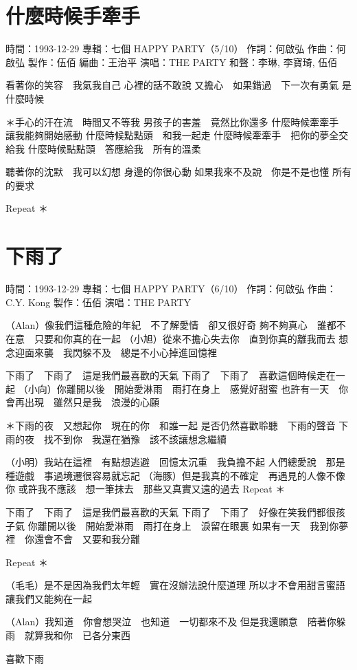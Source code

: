 \documentclass[UTF8,a4paper,oneside,twocolumn,12pt]{ctexbook}
\newcommand{\infopair}[2]{\textbullet #1：#2}
\newcommand{\zc}[1][伍佰]{\infopair{作詞}{#1}}
\newcommand{\zq}[1][伍佰]{\infopair{作曲}{#1}}
\newcommand{\bq}[1][伍佰]{\infopair{編曲}{#1}}
\newcommand{\zj}[1]{\infopair{專輯}{#1}}
\newcommand{\zz}[1]{\infopair{製作}{#1}}
\newcommand{\sj}[1]{\infopair{時間}{#1}}
\newenvironment{info}{\begin{flushleft}\kaishu
	}
	{\end{flushleft}\normalsize\yahei\par}
\newenvironment{lyric}{
	}
{}
\begin{document}
\section{什麼時候手牽手}
\begin{info}
	\sj{1993-12-29}
	\zj{七個 HAPPY PARTY（5/10）}
	\zc[何啟弘]
	\zq[何啟弘]
	\zz{伍佰}
	\bq[王治平]
	\infopair{演唱}{THE PARTY}
	\infopair{和聲}{李琳, 李寶琦, 伍佰}
\end{info}
\begin{lyric}
	看著你的笑容　我氣我自己
	心裡的話不敢說
	又擔心　如果錯過　下一次有勇氣
	是什麼時候

	＊手心的汗在流　時間又不等我
	男孩子的害羞　竟然比你還多
	什麼時候牽牽手　讓我能夠開始感動
	什麼時候點點頭　和我一起走
	什麼時候牽牽手　把你的夢全交給我
	什麼時候點點頭　答應給我　所有的溫柔

	聽著你的沈默　我可以幻想
	身邊的你很心動
	如果我來不及說　你是不是也懂
	所有的要求

	Repeat ＊
\end{lyric}

\section{下雨了}
\begin{info}
	\sj{1993-12-29}
	\zj{七個 HAPPY PARTY（6/10）}
	\zc[何啟弘]
	\zq[C.Y. Kong]
	\zz{伍佰}
	\infopair{演唱}{THE PARTY}
\end{info}
\begin{lyric}
	（Alan）像我們這種危險的年紀　不了解愛情　卻又很好奇
	夠不夠真心　誰都不在意　只要和你真的在一起
	（小旭）從來不擔心失去你　直到你真的離我而去
	想念迎面來襲　我閃躲不及　總是不小心掉進回憶裡

	下雨了　下雨了　這是我們最喜歡的天氣
	下雨了　下雨了　喜歡這個時候走在一起
	（小向）你離開以後　開始愛淋雨　雨打在身上　感覺好甜蜜
	也許有一天　你會再出現　雖然只是我　浪漫的心願

	＊下雨的夜　又想起你　現在的你　和誰一起
	是否仍然喜歡聆聽　下雨的聲音
	下雨的夜　找不到你　我還在猶豫　該不該讓想念繼續

	（小明）我站在這裡　有點想逃避　回憶太沉重　我負擔不起
	人們總愛說　那是種遊戲　事過境遷很容易就忘記
	（海豚）但是我真的不確定　再遇見的人像不像你
	或許我不應該　想一筆抹去　那些又真實又遠的過去
%
%
	Repeat ＊

	下雨了　下雨了　這是我們最喜歡的天氣
	下雨了　下雨了　好像在笑我們都很孩子氣
	你離開以後　開始愛淋雨　雨打在身上　淚留在眼裏
	如果有一天　我到你夢裡　你還會不會　又要和我分離

	Repeat ＊

	（毛毛）是不是因為我們太年輕　實在沒辦法說什麼道理
	所以才不會用甜言蜜語　讓我們又能夠在一起

	（Alan）我知道　你會想哭泣　也知道　一切都來不及
	但是我還願意　陪著你躲雨　就算我和你　已各分東西

	喜歡下雨
\end{lyric}
\end{document}
